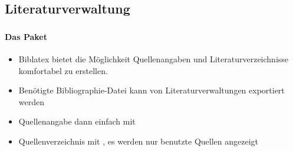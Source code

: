 \subsection{Literaturverwaltung}\label{biblatex}

\begin{frame}
    \frametitle{\subsecname}
    \framesubtitle{Das Paket }
    \begin{itemize}
        \item Biblatex bietet die Möglichkeit Quellenangaben und 
            Literaturverzeichnisse komfortabel zu erstellen.
        \item Benötigte Bibliographie-Datei kann von Literaturverwaltungen exportiert werden
        \item Quellenangabe dann einfach mit 
        \item Quellenverzeichnis mit , es werden nur
            benutzte Quellen angezeigt
    \end{itemize}
    
\end{frame}